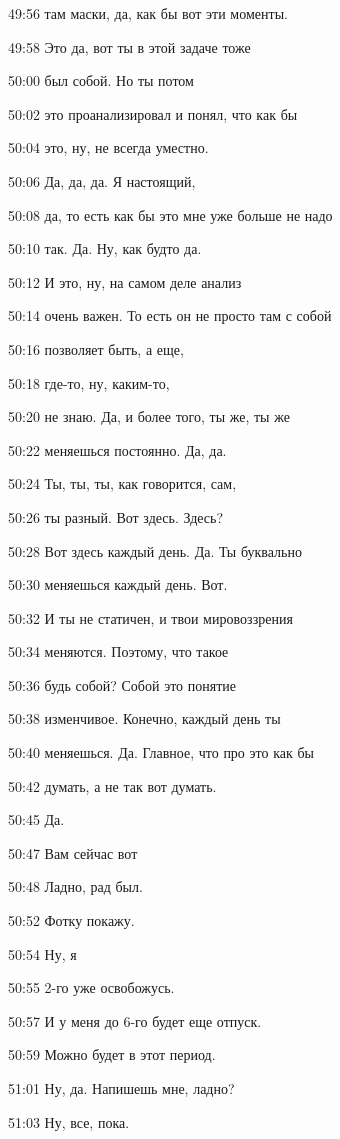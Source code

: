 49:56
там маски, да, как бы вот эти моменты.

49:58
Это да, вот ты в этой задаче тоже

50:00
был собой. Но ты потом

50:02
это проанализировал и понял, что как бы

50:04
это, ну, не всегда уместно.

50:06
Да, да, да. Я настоящий,

50:08
да, то есть как бы это мне уже больше не надо

50:10
так. Да. Ну, как будто да.

50:12
И это, ну, на самом деле анализ

50:14
очень важен. То есть он не просто там с собой

50:16
позволяет быть, а еще,

50:18
где-то, ну, каким-то,

50:20
не знаю. Да, и более того, ты же, ты же

50:22
меняешься постоянно. Да, да.

50:24
Ты, ты, ты, как говорится, сам,

50:26
ты разный. Вот здесь. Здесь?

50:28
Вот здесь каждый день. Да. Ты буквально

50:30
меняешься каждый день. Вот.

50:32
И ты не статичен, и твои мировоззрения

50:34
меняются. Поэтому, что такое

50:36
будь собой? Собой это понятие

50:38
изменчивое. Конечно, каждый день ты

50:40
меняешься. Да. Главное, что про это как бы

50:42
думать, а не так вот думать.

50:45
Да.

50:47
Вам сейчас вот

50:48
Ладно, рад был.

50:52
Фотку покажу.

50:54
Ну, я

50:55
2-го уже освобожусь.

50:57
И у меня до 6-го будет еще отпуск.

50:59
Можно будет в этот период.

51:01
Ну, да. Напишешь мне, ладно?

51:03
Ну, все, пока.
